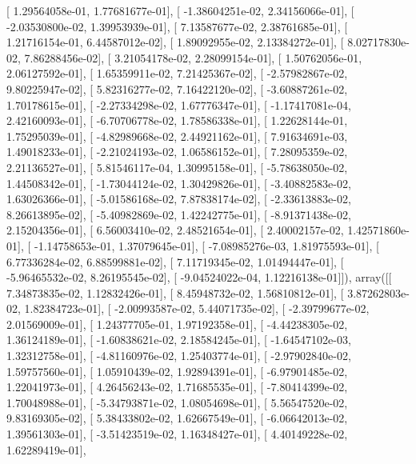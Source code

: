 \documentclass{article}
\begin{document}
       [  1.29564058e-01,   1.77681677e-01],
       [ -1.38604251e-02,   2.34156066e-01],
       [ -2.03530800e-02,   1.39953939e-01],
       [  7.13587677e-02,   2.38761685e-01],
       [  1.21716154e-01,   6.44587012e-02],
       [  1.89092955e-02,   2.13384272e-01],
       [  8.02717830e-02,   7.86288456e-02],
       [  3.21054178e-02,   2.28099154e-01],
       [  1.50762056e-01,   2.06127592e-01],
       [  1.65359911e-02,   7.21425367e-02],
       [ -2.57982867e-02,   9.80225947e-02],
       [  5.82316277e-02,   7.16422120e-02],
       [ -3.60887261e-02,   1.70178615e-01],
       [ -2.27334298e-02,   1.67776347e-01],
       [ -1.17417081e-04,   2.42160093e-01],
       [ -6.70706778e-02,   1.78586338e-01],
       [  1.22628144e-01,   1.75295039e-01],
       [ -4.82989668e-02,   2.44921162e-01],
       [  7.91634691e-03,   1.49018233e-01],
       [ -2.21024193e-02,   1.06586152e-01],
       [  7.28095359e-02,   2.21136527e-01],
       [  5.81546117e-04,   1.30995158e-01],
       [ -5.78638050e-02,   1.44508342e-01],
       [ -1.73044124e-02,   1.30429826e-01],
       [ -3.40882583e-02,   1.63026366e-01],
       [ -5.01586168e-02,   7.87838174e-02],
       [ -2.33613883e-02,   8.26613895e-02],
       [ -5.40982869e-02,   1.42242775e-01],
       [ -8.91371438e-02,   2.15204356e-01],
       [  6.56003410e-02,   2.48521654e-01],
       [  2.40002157e-02,   1.42571860e-01],
       [ -1.14758653e-01,   1.37079645e-01],
       [ -7.08985276e-03,   1.81975593e-01],
       [  6.77336284e-02,   6.88599881e-02],
       [  7.11719345e-02,   1.01494447e-01],
       [ -5.96465532e-02,   8.26195545e-02],
       [ -9.04524022e-04,   1.12216138e-01]]), array([[  7.34873835e-02,   1.12832426e-01],
       [  8.45948732e-02,   1.56810812e-01],
       [  3.87262803e-02,   1.82384723e-01],
       [ -2.00993587e-02,   5.44071735e-02],
       [ -2.39799677e-02,   2.01569009e-01],
       [  1.24377705e-01,   1.97192358e-01],
       [ -4.44238305e-02,   1.36124189e-01],
       [ -1.60838621e-02,   2.18584245e-01],
       [ -1.64547102e-03,   1.32312758e-01],
       [ -4.81160976e-02,   1.25403774e-01],
       [ -2.97902840e-02,   1.59757560e-01],
       [  1.05910439e-02,   1.92894391e-01],
       [ -6.97901485e-02,   1.22041973e-01],
       [  4.26456243e-02,   1.71685535e-01],
       [ -7.80414399e-02,   1.70048988e-01],
       [ -5.34793871e-02,   1.08054698e-01],
       [  5.56547520e-02,   9.83169305e-02],
       [  5.38433802e-02,   1.62667549e-01],
       [ -6.06642013e-02,   1.39561303e-01],
       [ -3.51423519e-02,   1.16348427e-01],
       [  4.40149228e-02,   1.62289419e-01],
\end{document}
